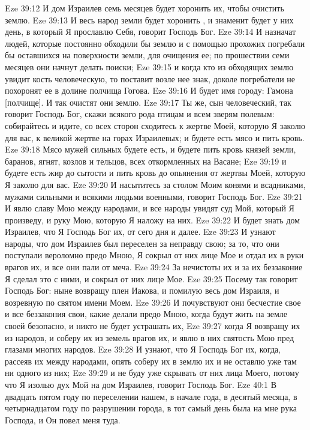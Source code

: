 \vs Eze 39:12 И дом Израилев семь месяцев будет хоронить их, чтобы очистить землю.
\vs Eze 39:13 И весь народ земли будет хоронить , и знаменит будет у них день, в который Я прославлю Себя, говорит Господь Бог.
\vs Eze 39:14 И назначат людей, которые постоянно обходили бы землю и с помощью прохожих погребали бы оставшихся на поверхности земли, для очищения ее; по прошествии семи месяцев они начнут делать поиски;
\vs Eze 39:15 и когда кто из обходящих землю увидит кость человеческую, то поставит возле нее знак, доколе погребатели не похоронят ее в долине полчища Гогова.
\vs Eze 39:16 И будет имя городу: Гамона [полчище]. И так очистят они землю.
\vs Eze 39:17 Ты же, сын человеческий, так говорит Господь Бог, скажи всякого рода птицам и всем зверям полевым: собирайтесь и идите, со всех сторон сходитесь к жертве Моей, которую Я заколю для вас, к великой жертве на горах Израилевых; и будете есть мясо и пить кровь.
\vs Eze 39:18 Мясо мужей сильных будете есть, и будете пить кровь князей земли, баранов, ягнят, козлов и тельцов, всех откормленных на Васане;
\vs Eze 39:19 и будете есть жир до сытости и пить кровь до опьянения от жертвы Моей, которую Я заколю для вас.
\vs Eze 39:20 И насытитесь за столом Моим конями и всадниками, мужами сильными и всякими людьми военными, говорит Господь Бог.
\vs Eze 39:21 И явлю славу Мою между народами, и все народы увидят суд Мой, который Я произведу, и руку Мою, которую Я наложу на них.
\vs Eze 39:22 И будет знать дом Израилев, что Я Господь Бог их, от сего дня и далее.
\vs Eze 39:23 И узнают народы, что дом Израилев был переселен за неправду свою; за то, что они поступали вероломно предо Мною, Я сокрыл от них лице Мое и отдал их в руки врагов их, и все они пали от меча.
\vs Eze 39:24 За нечистоты их и за их беззаконие Я сделал это с ними, и сокрыл от них лице Мое.
\vs Eze 39:25 Посему так говорит Господь Бог: ныне возвращу плен Иакова, и помилую весь дом Израиля, и возревную по святом имени Моем.
\vs Eze 39:26 И почувствуют они бесчестие свое и все беззакония свои, какие делали предо Мною, когда будут жить на земле своей безопасно, и никто не будет устрашать их,
\vs Eze 39:27 когда Я возвращу их из народов, и соберу их из земель врагов их, и явлю в них святость Мою пред глазами многих народов.
\vs Eze 39:28 И узнают, что Я Господь Бог их, когда, рассеяв их между народами, опять соберу их в землю их и не оставлю уже там ни одного из них;
\vs Eze 39:29 и не буду уже скрывать от них лица Моего, потому что Я изолью дух Мой на дом Израилев, говорит Господь Бог.
\vs Eze 40:1 В двадцать пятом году по переселении нашем, в начале года, в десятый  месяца, в четырнадцатом году по разрушении города, в тот самый день была на мне рука Господа, и Он повел меня туда.
